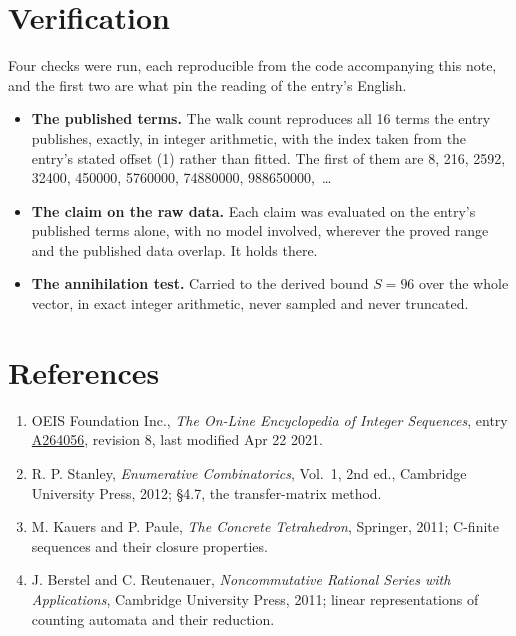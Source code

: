\documentclass[11pt]{article}
\theoremstyle{definition}
\begin{document}
\section{Verification}

Four checks were run, each reproducible from the code accompanying this note, and the first two are what pin the reading of the entry's English.

\begin{itemize}

\item {\bfseries The published terms.} The walk count reproduces all 16 terms the entry publishes, exactly, in integer arithmetic, with the index taken from the entry's stated offset (1) rather than fitted. The first of them are 8, 216, 2592, 32400, 450000, 5760000, 74880000, 988650000,~\dots

\item {\bfseries The claim on the raw data.} Each claim was evaluated on the entry's published terms alone, with no model involved, wherever the proved range and the published data overlap. It holds there.

\item {\bfseries The annihilation test.} Carried to the derived bound $S = 96$ over the whole vector, in exact integer arithmetic, never sampled and never truncated.

\end{itemize}

\section{References}

\begin{enumerate}

\item OEIS Foundation Inc., \emph{The On-Line Encyclopedia of Integer Sequences}, entry \href{https://oeis.org/A264056}{A264056}, revision 8, last modified Apr 22 2021.

\item R. P. Stanley, \emph{Enumerative Combinatorics}, Vol.~1, 2nd ed., Cambridge University Press, 2012; \S4.7, the transfer-matrix method.

\item M. Kauers and P. Paule, \emph{The Concrete Tetrahedron}, Springer, 2011; C-finite sequences and their closure properties.

\item J. Berstel and C. Reutenauer, \emph{Noncommutative Rational Series with Applications}, Cambridge University Press, 2011; linear representations of counting automata and their reduction.

\end{enumerate}
\end{document}
